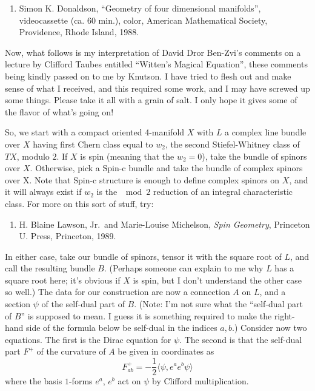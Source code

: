 \documentclass[12pt]{article}
\def\tightlist{}
\begin{document}
\begin{enumerate}
\def\labelenumi{\arabic{enumi})}
\setcounter{enumi}{1}
\tightlist
\item
   Simon K. Donaldson, ``Geometry of four dimensional manifolds'', 
  videocassette (ca. 60 min.), color, American Mathematical
  Society, Providence, Rhode Island, 1988.
\end{enumerate}

Now, what follows is my interpretation of David Dror Ben-Zvi's comments
on a lecture by Clifford Taubes entitled ``Witten's Magical Equation'',
these comments being kindly passed on to me by Knutson. I have tried to
flesh out and make sense of what I received, and this required some
work, and I may have screwed up some things. Please take it all with a
grain of salt. I only hope it gives some of the flavor of what's going
on!

So, we start with a compact oriented 4-manifold \(X\) with \(L\) a
complex line bundle over \(X\) having first Chern class equal to
\(w_2\), the second Stiefel-Whitney class of \(TX\), modulo \(2\). If
\(X\) is spin (meaning that the \(w_2 = 0\)), take the bundle of spinors
over \(X\). Otherwise, pick a Spin-c bundle and take the bundle of
complex spinors over X. Note that Spin-c structure is enough to define
complex spinors on \(X\), and it will always exist if \(w_2\) is the
\(\mod 2\) reduction of an integral characteristic class. For more on
this sort of stuff, try:

\begin{enumerate}
\def\labelenumi{\arabic{enumi})}
\setcounter{enumi}{2}
\tightlist
\item
  H. Blaine Lawson, Jr.~and Marie-Louise
  Michelson, \emph{Spin Geometry}, Princeton U. Press, Princeton, 1989.
\end{enumerate}

In either case, take our bundle of spinors, tensor it with the square
root of \(L\), and call the resulting bundle \(B\). (Perhaps someone can
explain to me why \(L\) has a square root here; it's obvious if \(X\) is
spin, but I don't understand the other case so well.) The data for our
construction are now a connection \(A\) on \(L\), and a section \(\psi\)
of the self-dual part of \(B\). (Note: I'm not sure what the ``self-dual
part of \(B\)'' is supposed to mean. I guess it is something required to
make the right-hand side of the formula below be self-dual in the
indices \(a,b\).) Consider now two equations. The first is the Dirac
equation for \(\psi\). The second is that the self-dual part \(F^+\) of
the curvature of \(A\) be given in coordinates as
\[F^+_{ab} = -\frac12 \langle\psi, e^a e^b \psi\rangle\] where the basis
\(1\)-forms \(e^a\), \(e^b\) act on \(\psi\) by Clifford multiplication.
\end{document}
